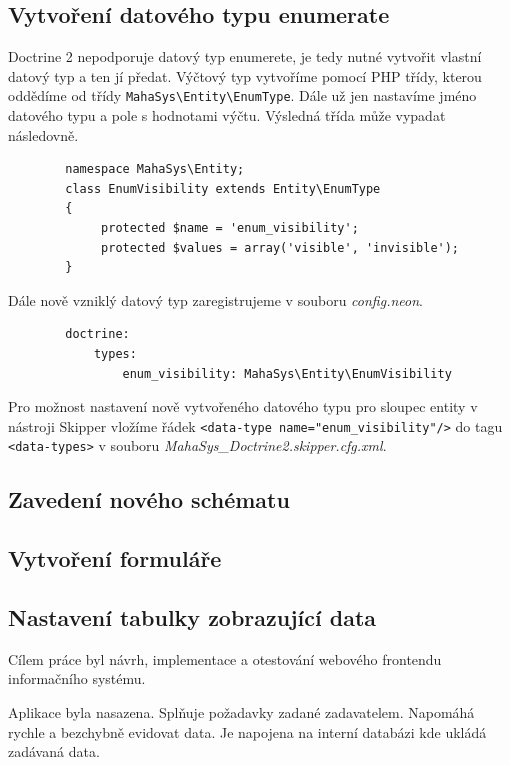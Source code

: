 \documentclass[thesis=B,czech]{FITthesis}[2012/06/26]
\begin{document}
\subsection{Vytvoření datového typu enumerate}
	Doctrine 2 nepodporuje datový typ enumerete, je tedy nutné vytvořit vlastní datový typ a ten jí předat. Výčtový typ vytvoříme pomocí PHP třídy, kterou oddědíme od třídy \verb|MahaSys\Entity\EnumType|. Dále už jen nastavíme jméno datového typu a pole s hodnotami výčtu. Výsledná třída může vypadat následovně.
	\begin{verbatim}
		namespace MahaSys\Entity;
		class EnumVisibility extends Entity\EnumType
		{
		     protected $name = 'enum_visibility';
		     protected $values = array('visible', 'invisible');
		}
	\end{verbatim}
	Dále nově vzniklý datový typ zaregistrujeme v souboru \emph{config.neon}.
	\begin{verbatim}
		doctrine:
			types: 
				enum_visibility: MahaSys\Entity\EnumVisibility
	\end{verbatim}
	Pro možnost nastavení nově vytvořeného datového typu pro sloupec entity v nástroji Skipper vložíme řádek \verb|<data-type name="enum_visibility"/>| do tagu \verb|<data-types>| v souboru \emph{MahaSys\_Doctrine2.skipper.cfg.xml}.
\subsection{Zavedení nového schématu}
\subsection{Vytvoření formuláře}
\subsection{Nastavení tabulky zobrazující data}

\begin{conclusion}
	Cílem práce byl návrh, implementace a otestování webového frontendu informačního systému.
	
	Aplikace byla nasazena. Splňuje požadavky zadané zadavatelem. Napomáhá rychle a bezchybně evidovat data. Je napojena na interní databázi kde ukládá zadávaná data.
\end{conclusion}



\end{document}
